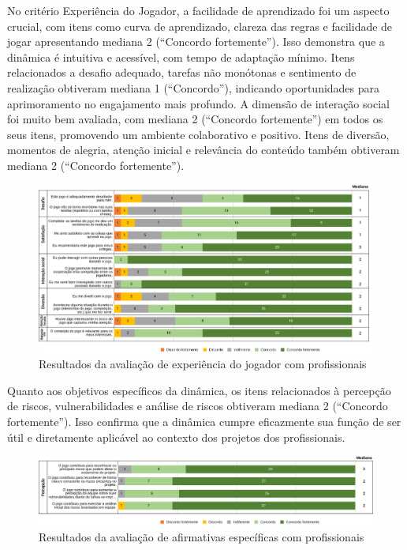 \documentclass[12pt]{article}
\begin{document}
No critério Experiência do Jogador, a facilidade de aprendizado foi um aspecto crucial, com itens como curva de aprendizado, clareza das regras e facilidade de jogar apresentando mediana 2 (“Concordo fortemente”). Isso demonstra que a dinâmica é intuitiva e acessível, com tempo de adaptação mínimo. Itens relacionados a desafio adequado, tarefas não monótonas e sentimento de realização obtiveram mediana 1 (“Concordo”), indicando oportunidades para aprimoramento no engajamento mais profundo. A dimensão de interação social foi muito bem avaliada, com mediana 2 (“Concordo fortemente”) em todos os seus itens, promovendo um ambiente colaborativo e positivo. Itens de diversão, momentos de alegria, atenção inicial e relevância do conteúdo também obtiveram mediana 2 (“Concordo fortemente”).

\begin{figure}[H]
	\caption{\label{bridge-xp-jogador} Resultados da avaliação de experiência do jogador com profissionais}
  \includegraphics[width=\textwidth]{bridge-xp-jogador}
\end{figure}

Quanto aos objetivos específicos da dinâmica, os itens relacionados à percepção de riscos, vulnerabilidades e análise de riscos obtiveram mediana 2 (“Concordo fortemente”). Isso confirma que a dinâmica cumpre eficazmente sua função de ser útil e diretamente aplicável ao contexto dos projetos dos profissionais.

\begin{figure}[H]
	\caption{\label{bridge-afirmativas} Resultados da avaliação de afirmativas específicas com profissionais}
  \includegraphics[width=\textwidth]{bridge-afirmativas}
\end{figure}
\end{document}
